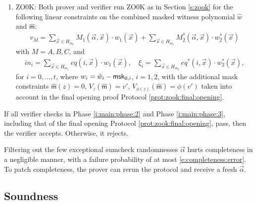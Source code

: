 \begin{protocol}[zk-IOPP]
\begin{enumerate}
\item 
\label{i:main:phase:3}
ZO0K: 
Both prover and verifier run \textcolor{PineGreen}{ZO0K as in Section \ref{s:zook}} for the following linear constraints on the combined \textcolor{PineGreen}{masked} witness polynomial $\hat w$ \textcolor{PineGreen}{and $\hat{\mathsf m}$}:
\begin{align}
\label{e:phase3:claim:vM}
v_M = \sum_{\vec x\in H_{m_1}} M_1(\vec\alpha, \vec x) \cdot w_1(\vec x) + \sum_{\vec x\in H_{m_1}} M_2^*(\vec\alpha,\vec x)\cdot w_2^*(\vec x)
\end{align}
with $M = A,B,C$, and
\begin{align}
\label{e:phase3:claim:inputs}
in_i = \sum_{\vec x \in H_{m_1}} eq(i, \vec x) \cdot w_1(\vec x),
\quad 
\xi_i = \sum_{\vec x \in H_{m_2}} eq^*(i, \vec x) \cdot w_2^*(\vec x),
\end{align}
for $i = 0,\ldots, t$, \textcolor{PineGreen}{where $w_i = \hat w_i - \mathsf{msk}_{0,i}$, $i=1,2$, 
with the additional mask constraints $\hat{\mathsf m}(z) = 0$, $V_z(\hat{\mathsf m}) = v'$, $V_{\phi(z)}(\hat{\mathsf m}) = \phi(v')$ taken into account in the final opening proof Protocol \ref{prot:zook:final:opening}}.
\end{enumerate}
If all verifier checks in Phase \ref{i:main:phase:2} and Phase \ref{i:main:phase:3}, including that of the final opening Protocol \ref{prot:zook:final:opening}, pass, then the verifier accepts.
Otherwise, it rejects.
\end{protocol}

\begin{rem}
Filtering out the few exceptional sumcheck randomnesses $\vec\alpha$ hurts completeness in a negligible manner, with a failure probability of at most \eqref{e:completeness:error}.
To patch completeness, the prover can rerun the protocol and receive a fresh $\vec\alpha$.
\end{rem}



\subsection{Soundness}
\label{s:zkIOPP:soundness:discussion}

